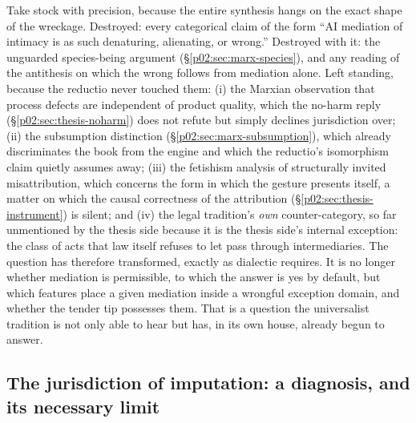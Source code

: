 Take stock with precision, because the entire synthesis hangs on the exact shape of the wreckage. Destroyed: every categorical claim of the form ``AI mediation of intimacy is as such denaturing, alienating, or wrong.'' Destroyed with it: the unguarded species-being argument (\S\ref{p02:sec:marx-species}), and any reading of the antithesis on which the wrong follows from mediation alone. Left standing, because the reductio never touched them: (i) the Marxian observation that process defects are independent of product quality, which the no-harm reply (\S\ref{p02:sec:thesis-noharm}) does not refute but simply declines jurisdiction over; (ii) the subsumption distinction (\S\ref{p02:sec:marx-subsumption}), which already discriminates the book from the engine and which the reductio's isomorphism claim quietly assumes away; (iii) the fetishism analysis of structurally invited misattribution, which concerns the form in which the gesture presents itself, a matter on which the causal correctness of the attribution (\S\ref{p02:sec:thesis-instrument}) is silent; and (iv) the legal tradition's \emph{own} counter-category, so far unmentioned by the thesis side because it is the thesis side's internal exception: the class of acts that law itself refuses to let pass through intermediaries. The question has therefore transformed, exactly as dialectic requires. It is no longer whether mediation is permissible, to which the answer is yes by default, but which features place a given mediation inside a wrongful exception domain, and whether the tender tip possesses them. That is a question the universalist tradition is not only able to hear but has, in its own house, already begun to answer.

\subsection{The jurisdiction of imputation: a diagnosis, and its necessary limit}
\label{p02:sec:thesis-jurisdiction}

